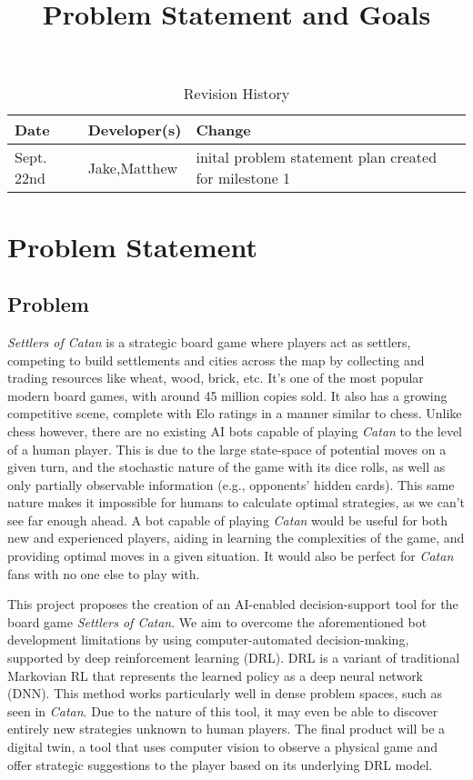 \documentclass{article}
\title{Problem Statement and Goals\\\progname}
\author{\authname}
\date{}
\begin{document}
\maketitle

\begin{table}[hp]
\caption{Revision History} \label{TblRevisionHistory}
\begin{tabularx}{\textwidth}{llX}
\toprule
\textbf{Date} & \textbf{Developer(s)} & \textbf{Change}\\
\midrule
Sept. 22nd & Jake,Matthew & inital problem statement plan created for milestone 1\\
\bottomrule
\end{tabularx}
\end{table}

\section{Problem Statement}\label{sec:problem-statement}

\subsection{Problem}
\emph{Settlers of Catan} is a strategic board game where players act as settlers, competing to build settlements and cities across the map by collecting and trading resources like wheat, wood, brick, etc.
It's one of the most popular modern board games, with around 45 million copies sold.
It also has a growing competitive scene, complete with Elo ratings in a manner similar to chess.
Unlike chess however, there are no existing AI bots capable of playing \emph{Catan} to the level of a human player.
This is due to the large state-space of potential moves on a given turn, and the stochastic nature of the game with its dice rolls, as well as only partially observable information (e.g., opponents' hidden cards).
This same nature makes it impossible for humans to calculate optimal strategies, as we can't see far enough ahead.
A bot capable of playing \emph{Catan} would be useful for both new and experienced players, aiding in learning the complexities of the game, and providing optimal moves in a given situation.
It would also be perfect for \emph{Catan} fans with no one else to play with.

This project proposes the creation of an AI-enabled decision-support tool for the board game \emph{Settlers of Catan}.
We aim to overcome the aforementioned bot development limitations by using computer-automated decision-making, supported by deep reinforcement learning (DRL).
DRL is a variant of traditional Markovian RL that represents the learned policy as a deep neural network (DNN).
This method works particularly well in dense problem spaces, such as seen in \emph{Catan}.
Due to the nature of this tool, it may even be able to discover entirely new strategies unknown to human players.
The final product will be a digital twin, a tool that uses computer vision to observe a physical game and offer strategic suggestions to the player based on its underlying DRL model.
\end{document}
